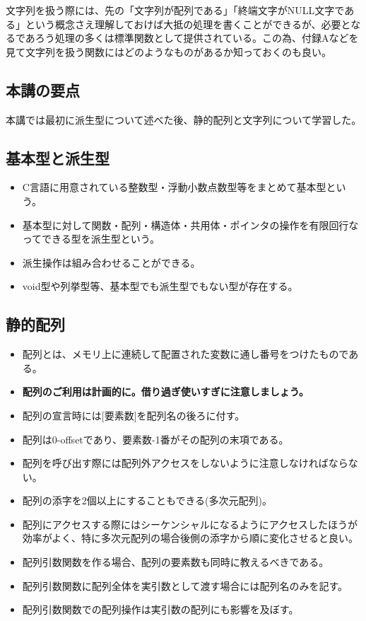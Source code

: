 文字列を扱う際には、先の「文字列が配列である」「終端文字がNULL文字である」という概念さえ理解しておけば大抵の処理を書くことができるが、必要となるであろう処理の多くは標準関数として提供されている。この為、付録Aなどを見て文字列を扱う関数にはどのようなものがあるか知っておくのも良い。
\newpage
\begin{shadebox}
\section*{本講の要点}
本講では最初に派生型について述べた後、静的配列と文字列について学習した。
\subsection*{基本型と派生型}
\begin{itemize}
\item C言語に用意されている整数型・浮動小数点数型等をまとめて基本型という。
\item 基本型に対して関数・配列・構造体・共用体・ポインタの操作を有限回行なってできる型を派生型という。
\item 派生操作は組み合わせることができる。
\item void型や列挙型等、基本型でも派生型でもない型が存在する。
\end{itemize}

\subsection*{静的配列}
\begin{itemize}
\item 配列とは、メモリ上に連続して配置された変数に通し番号をつけたものである。
\item \textbf{配列のご利用は計画的に。借り過ぎ使いすぎに注意しましょう。}
\item 配列の宣言時には[要素数]を配列名の後ろに付す。
\item 配列は0-offsetであり、要素数-1番がその配列の末項である。
\item 配列を呼び出す際には配列外アクセスをしないように注意しなければならない。
\item 配列の添字を2個以上にすることもできる(多次元配列)。
\item 配列にアクセスする際にはシーケンシャルになるようにアクセスしたほうが効率がよく、特に多次元配列の場合後側の添字から順に変化させると良い。
\item 配列引数関数を作る場合、配列の要素数も同時に教えるべきである。
\item 配列引数関数に配列全体を実引数として渡す場合には配列名のみを記す。
\item 配列引数関数での配列操作は実引数の配列にも影響を及ぼす。
\end{itemize}


\end{shadebox}
